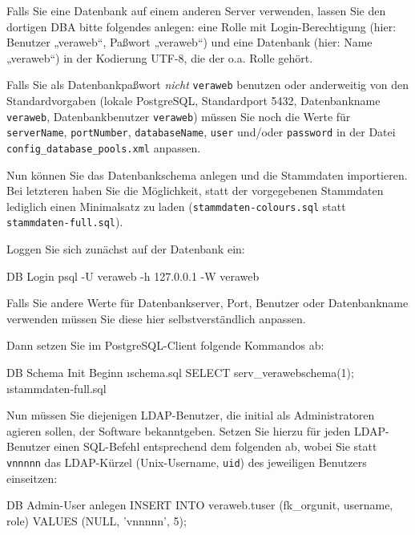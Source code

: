 \documentclass{tarentanleitung}
\begin{document}
Falls Sie eine Datenbank auf einem anderen Server verwenden, lassen
Sie den dortigen DBA bitte folgendes anlegen: eine Rolle mit
Login-Berechtigung (hier: Benutzer „veraweb“, Paßwort „veraweb“)
und eine Datenbank (hier: Name „veraweb“) in der Kodierung UTF-8,
die der o.a. Rolle gehört.

Falls Sie als Datenbankpaßwort \emph{nicht} \texttt{veraweb} benutzen oder
anderweitig von den Standardvorgaben (lokale PostgreSQL, Standardport 5432,
Datenbankname \texttt{veraweb}, Datenbankbenutzer \texttt{veraweb}) müssen
Sie noch die Werte für \texttt{serverName}, \texttt{portNumber},
\texttt{databaseName}, \texttt{user} und/oder \texttt{password} in der
Datei \texttt{config\_database\_pools.xml} anpassen.

Nun können Sie das Datenbankschema anlegen und die Stammdaten importieren.
Bei letzteren haben Sie die Möglichkeit, statt der vorgegebenen Stammdaten
lediglich einen Minimalsatz zu laden (\texttt{stammdaten-colours.sql} statt
\texttt{stammdaten-full.sql}).

\begin{minipage}{\linewidth}
Loggen Sie sich zunächst auf der Datenbank ein:

\begin{lstdump}{DB Login}
psql -U veraweb -h 127.0.0.1 -W veraweb
\end{lstdump}
\end{minipage}

Falls Sie andere Werte für Datenbankserver, Port, Benutzer oder Datenbankname
verwenden müssen Sie diese hier selbstverständlich anpassen.

\begin{minipage}{\linewidth}
Dann setzen Sie im PostgreSQL-Client folgende Kommandos ab:

\begin{lstdump}{DB Schema Init Beginn}
\i schema.sql
SELECT serv_verawebschema(1);
\i stammdaten-full.sql
\end{lstdump}
\end{minipage}

\begin{minipage}{\linewidth}
Nun müssen Sie diejenigen LDAP-Benutzer, die initial als Administratoren
agieren sollen, der Software bekanntgeben. Setzen Sie hierzu für jeden
LDAP-Benutzer einen SQL-Befehl entsprechend dem folgenden ab, wobei Sie
statt \texttt{vnnnnn} das LDAP-Kürzel (Unix-Username, \texttt{uid}) des
jeweiligen Benutzers einseitzen:

\begin{lstdump}[language=SQL]{DB Admin-User anlegen}
INSERT INTO veraweb.tuser (fk_orgunit, username, role)
    VALUES (NULL, 'vnnnnn', 5);
\end{lstdump}\label{manual:db-user}
\end{minipage}
\end{document}
